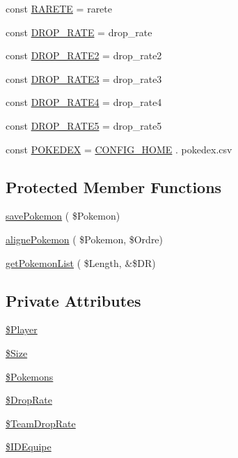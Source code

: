 \begin{DoxyCompactItemize}
const \hyperlink{class_coll_team_a33157a5836e01f9f8fdb52d4341efcdb}{R\+A\+R\+E\+TE} = \textquotesingle{}rarete\textquotesingle{}
\item 
const \hyperlink{class_coll_team_a56b61dd3f2c56a8eebe71d512d93096c}{D\+R\+O\+P\+\_\+\+R\+A\+TE} = \textquotesingle{}drop\+\_\+rate\textquotesingle{}
\item 
const \hyperlink{class_coll_team_aba49557b0846574c1bc0f33caa423ffc}{D\+R\+O\+P\+\_\+\+R\+A\+T\+E2} = \textquotesingle{}drop\+\_\+rate2\textquotesingle{}
\item 
const \hyperlink{class_coll_team_affce5675ff2868cf0a0dab338d301d7e}{D\+R\+O\+P\+\_\+\+R\+A\+T\+E3} = \textquotesingle{}drop\+\_\+rate3\textquotesingle{}
\item 
const \hyperlink{class_coll_team_a2122962db95fb39179cc4f4df0198f8c}{D\+R\+O\+P\+\_\+\+R\+A\+T\+E4} = \textquotesingle{}drop\+\_\+rate4\textquotesingle{}
\item 
const \hyperlink{class_coll_team_a3ee816cf3264be0186fa8acb3f1d8ebb}{D\+R\+O\+P\+\_\+\+R\+A\+T\+E5} = \textquotesingle{}drop\+\_\+rate5\textquotesingle{}
\item 
const \hyperlink{class_coll_team_a2c56adbfdb1008442228323f3a87ab7c}{P\+O\+K\+E\+D\+EX} = \hyperlink{application_2src_2define_8php_aa32003175807358a35405b1e01132669}{C\+O\+N\+F\+I\+G\+\_\+\+H\+O\+ME} . \textquotesingle{}pokedex.\+csv\textquotesingle{}
\end{DoxyCompactItemize}
\subsection*{Protected Member Functions}
\begin{DoxyCompactItemize}
\item 
\hyperlink{class_coll_team_aa72d17df4167ca7a0a71ff6c7dd9dc19}{save\+Pokemon} ( \$Pokemon)
\item 
\hyperlink{class_coll_team_a11c61e291459ab9063885e1a94d12a8c}{aligne\+Pokemon} ( \$Pokemon, \$Ordre)
\item 
\hyperlink{class_coll_team_ab2e2067144092a1873ddafe1532d14a1}{get\+Pokemon\+List} ( \$Length, \&\$DR)
\end{DoxyCompactItemize}
\subsection*{Private Attributes}
\begin{DoxyCompactItemize}
\item 
\hyperlink{class_coll_team_ae766df808adac0bf0daf63cb7d292e03}{\$\+Player}
\item 
\hyperlink{class_coll_team_a89066b0a24109065e5bf929fe338b211}{\$\+Size}
\item 
\hyperlink{class_coll_team_adba5d78176edf5eb1308e65c88471559}{\$\+Pokemons}
\item 
\hyperlink{class_coll_team_a84d976fc5437fdd0a8e99c3ad9406519}{\$\+Drop\+Rate}
\item 
\hyperlink{class_coll_team_a6b0cd6635f04c3d4984dcdbf904c4d9e}{\$\+Team\+Drop\+Rate}
\item 
\hyperlink{class_coll_team_ace628c0a1423f296417efb5105588114}{\$\+I\+D\+Equipe}
\end{DoxyCompactItemize}


